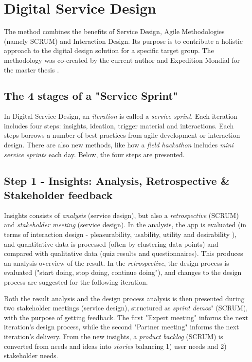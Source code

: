 \section{Digital Service Design} \label{digital-service-design}

The method combines the benefits of Service Design, Agile Methodologies (namely SCRUM) and Interaction Design. Its purpose is to contribute a holistic approach to the digital design solution for a specific target group. The methodology was co-created by the current author and Expedition Mondial for the master thesis \citep{nissar}.

\subsection{The 4 stages of a "Service Sprint"}
In Digital Service Design, an \textit{iteration} is called a \textit{service sprint}. Each iteration includes four steps: insights, ideation, trigger material and interactions. Each steps borrows a number of best practices from agile development or interaction design. There are also new methods, like how a \textit{field hackathon} includes \textit{mini service sprints} each day. Below, the four steps are presented.

\subsection{Step 1 - Insights: Analysis, Retrospective \& Stakeholder feedback}
  Insights consists of \textit{analysis} (service design), but also a \textit{retrospective} (SCRUM) and \textit{stakeholder meeting} (service design). In the analysis, the app is evaluated (in terms of interaction design - pleasurability, usability, utility and desirability \citep{clatworthy}), and quantitative data is processed (often by clustering data points) and compared with qualitative data (quiz results and questionnaires). This produces an analysis overview of the result. In the \textit{retrospective}, the design process is evaluated ("start doing, stop doing, continue doing"), and changes to the design process are suggested for the following iteration.

    Both the result analysis and the design process analysis is then presented during two stakeholder meetings (service design), structured as \textit{sprint demo}s" (SCRUM), with the purpose of getting feedback. The first "Expert meeting" informs the next iteration's design process, while the second "Partner meeting" informs the next iteration's delivery. From the new insights, a \textit{product backlog} (SCRUM) is converted from needs and ideas into \textit{stories} balancing 1) user needs and 2) stakeholder needs.

